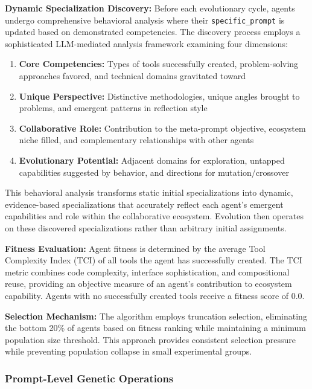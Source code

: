 \textbf{Dynamic Specialization Discovery:} Before each evolutionary cycle, agents undergo comprehensive behavioral analysis where their \texttt{specific\_prompt} is updated based on demonstrated competencies. The discovery process employs a sophisticated LLM-mediated analysis framework examining four dimensions:
\begin{enumerate}
    \item \textbf{Core Competencies:} Types of tools successfully created, problem-solving approaches favored, and technical domains gravitated toward
    \item \textbf{Unique Perspective:} Distinctive methodologies, unique angles brought to problems, and emergent patterns in reflection style
    \item \textbf{Collaborative Role:} Contribution to the meta-prompt objective, ecosystem niche filled, and complementary relationships with other agents
    \item \textbf{Evolutionary Potential:} Adjacent domains for exploration, untapped capabilities suggested by behavior, and directions for mutation/crossover
\end{enumerate}

This behavioral analysis transforms static initial specializations into dynamic, evidence-based specializations that accurately reflect each agent's emergent capabilities and role within the collaborative ecosystem. Evolution then operates on these discovered specializations rather than arbitrary initial assignments.

\textbf{Fitness Evaluation:} Agent fitness is determined by the average Tool Complexity Index (TCI) of all tools the agent has successfully created. The TCI metric combines code complexity, interface sophistication, and compositional reuse, providing an objective measure of an agent's contribution to ecosystem capability. Agents with no successfully created tools receive a fitness score of 0.0.

\textbf{Selection Mechanism:} The algorithm employs truncation selection, eliminating the bottom 20\% of agents based on fitness ranking while maintaining a minimum population size threshold. This approach provides consistent selection pressure while preventing population collapse in small experimental groups.

\subsubsection{Prompt-Level Genetic Operations}

